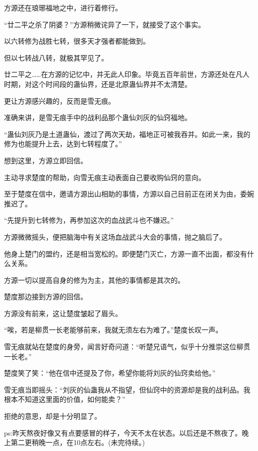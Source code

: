 \begin{this_body}
方源还在琅琊福地之中，进行着修行。

“廿二平之杀了阴婆？”方源稍微诧异了一下，就接受了这个事实。

以六转修为战胜七转，很多天才强者都能做到。

但以七转战八转，就极其罕见了。

廿二平之……在方源的记忆中，并无此人印象。毕竟五百年前世，方源还处在凡人时期，对这个时间段的蛊仙界，还是北原蛊仙界并不太清楚。

更让方源感兴趣的，反而是雪无痕。

准确来讲，是雪无痕手中的战利品那个蛊仙刘灰的仙窍福地。

“蛊仙刘灰乃是土道蛊仙，渡过了两次天劫，福地正可被我吞并。如此一来，我的修为也能提升上去，达到七转程度了。”

想到这里，方源立即回信。

主动寻求楚度的帮助，向雪无痕主动表面自己要收购仙窍的意向。

至于楚度在信中，邀请方源出山相助的事情，方源以自己目前正在闭关为由，委婉推迟了。

“先提升到七转修为，再参加这次的血战武斗也不嫌迟。”

方源微微摇头，便把脑海中有关这场血战武斗大会的事情，抛之脑后了。

他身上楚门的盟约，还是相当宽松的。即便楚门灭亡，方源一直不出面，都没有什么关系。

方源一切以提高自身的修为为主，其他的事情都是其次的。

楚度那边接到方源的回信。

方源没有前来，这让楚度皱起了眉头。

“唉，若是柳贯一长老能够前来，我就无须左右为难了。”楚度长叹一声。

雪无痕就站在楚度的身旁，闻言好奇问道：“听楚兄语气，似乎十分推崇这位柳贯一长老。”

楚度笑了笑：“他在信中还提及了你，希望你能将刘灰的仙窍卖给他。”

雪无痕当即摇头：“刘灰的仙蛊我从不指望，但仙窍中的资源却是我的战利品。我根本不知道这里面的价值，如何能卖？”

拒绝的意思，却是十分明显了。

ps:昨天熬夜好像又有点要感冒的样子，今天不太在状态。以后还是不熬夜了。晚上第二更稍晚一点，在10点左右。(未完待续。)

\end{this_body}

